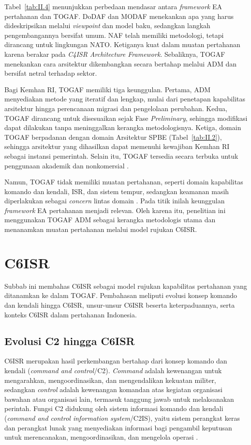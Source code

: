 Tabel~\ref{tab:II.4} menunjukkan perbedaan mendasar antara \textit{framework} EA pertahanan dan TOGAF. DoDAF dan MODAF menekankan apa yang harus dideskripsikan melalui \textit{viewpoint} dan model baku, sedangkan langkah pengembangannya bersifat umum. NAF telah memiliki metodologi, tetapi dirancang untuk lingkungan NATO. Ketiganya kuat dalam muatan pertahanan karena berakar pada \textit{C4ISR Architecture Framework}. Sebaliknya, TOGAF menekankan cara arsitektur dikembangkan secara bertahap melalui ADM dan bersifat netral terhadap sektor.

Bagi Kemhan RI, TOGAF memiliki tiga keunggulan. Pertama, ADM menyediakan metode yang iteratif dan lengkap, mulai dari penetapan kapabilitas arsitektur hingga perencanaan migrasi dan pengelolaan perubahan. Kedua, TOGAF dirancang untuk disesuaikan sejak Fase \textit{Preliminary}, sehingga modifikasi dapat dilakukan tanpa meninggalkan kerangka metodologisnya. Ketiga, domain TOGAF berpadanan dengan domain Arsitektur SPBE (Tabel~\ref{tab:II.2}), sehingga arsitektur yang dihasilkan dapat memenuhi kewajiban Kemhan RI sebagai instansi pemerintah. Selain itu, TOGAF tersedia secara terbuka untuk penggunaan akademik dan nonkomersial \cite{TOGAF2022}.

Namun, TOGAF tidak memiliki muatan pertahanan, seperti domain kapabilitas komando dan kendali, ISR, dan sistem tempur, sedangkan keamanan masih diperlakukan sebagai \textit{concern} lintas domain \cite{TOGAFRiskSecurity}. Pada titik inilah keunggulan \textit{framework} EA pertahanan menjadi relevan. Oleh karena itu, penelitian ini menggunakan TOGAF ADM sebagai kerangka metodologis utama dan menanamkan muatan pertahanan melalui model rujukan C6ISR.

\section{C6ISR}
\label{sec:II.7}

Subbab ini membahas C6ISR sebagai model rujukan kapabilitas pertahanan yang ditanamkan ke dalam TOGAF. Pembahasan meliputi evolusi konsep komando dan kendali hingga C6ISR, unsur-unsur C6ISR beserta keterpaduannya, serta konteks C6ISR dalam pertahanan Indonesia.

\subsection{Evolusi C2 hingga C6ISR}
\label{sec:II.7.1}

C6ISR merupakan hasil perkembangan bertahap dari konsep komando dan kendali (\textit{command and control}/C2). \textit{Command} adalah kewenangan untuk mengarahkan, mengoordinasikan, dan mengendalikan kekuatan militer, sedangkan \textit{control} adalah kewenangan komandan atas kegiatan organisasi bawahan atau organisasi lain, termasuk tanggung jawab untuk melaksanakan perintah. Fungsi C2 didukung oleh sistem informasi komando dan kendali (\textit{command and control information system}/C2IS), yaitu sistem perangkat keras dan perangkat lunak yang menyediakan informasi bagi pengambil keputusan untuk merencanakan, mengoordinasikan, dan mengelola operasi \cite{Todorovic2025}.


